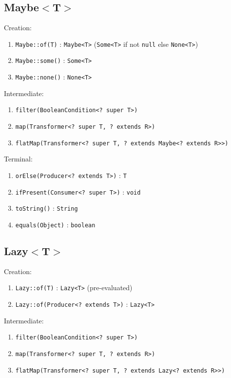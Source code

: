 \documentclass[12pt, a4paper]{article}
\begin{document}
\begin{multicols*}{2}
\subsection{Maybe$<$T$>$}
Creation:
\begin{enumerate}[\roman*.]
  \item \lstinline|Maybe::of(T)| : \lstinline|Maybe<T>| (\lstinline|Some<T>| if not \lstinline|null| else \lstinline|None<T>|)
  \item \lstinline|Maybe::some()| : \lstinline|Some<T>|
  \item \lstinline|Maybe::none()| : \lstinline|None<T>|
\end{enumerate}

Intermediate:
\begin{enumerate}[\roman*.]
  \item \lstinline|filter(BooleanCondition<? super T>)|
  \item \lstinline|map(Transformer<? super T, ? extends R>)|
  \item \lstinline|flatMap(Transformer<? super T, ? extends Maybe<? extends R>>)|
\end{enumerate}

Terminal:
\begin{enumerate}[\roman*.]
  \item \lstinline|orElse(Producer<? extends T>)| : \lstinline|T|
  \item \lstinline|ifPresent(Consumer<? super T>)| : \lstinline|void|
  \item \lstinline|toString()| : \lstinline|String|
  \item \lstinline|equals(Object)| : \lstinline|boolean|
\end{enumerate}

\subsection{Lazy$<$T$>$}
Creation:
\begin{enumerate}[\roman*.]
  \item \lstinline|Lazy::of(T)| : \lstinline|Lazy<T>| (pre-evaluated)
  \item \lstinline|Lazy::of(Producer<? extends T>)| : \lstinline|Lazy<T>|
\end{enumerate}

Intermediate:
\begin{enumerate}[\roman*.]
  \item \lstinline|filter(BooleanCondition<? super T>)|
  \item \lstinline|map(Transformer<? super T, ? extends R>)|
  \item \lstinline|flatMap(Transformer<? super T, ? extends Lazy<? extends R>>)|
\end{enumerate}


\end{multicols*}
\end{document}
